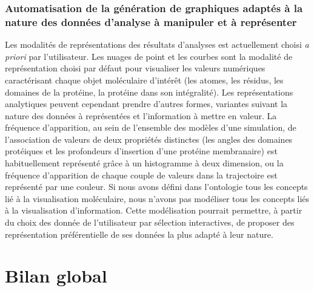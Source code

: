 \subsubsection*{Automatisation de la génération de graphiques adaptés à la nature des données d'analyse à manipuler et à représenter}

Les modalités de représentations des résultats d'analyses est actuellement choisi \textit{a  priori} par l'utilisateur. Les nuages de point et les courbes sont la modalité de représentation choisi par défaut pour visualiser les valeurs numériques caractérisant chaque objet moléculaire d'intérêt (les atomes, les résidus, les domaines de la protéine, la protéine dans son intégralité). Les représentations analytiques peuvent cependant prendre d'autres formes, variantes suivant la nature des données à représentées et l'information à mettre en valeur.  La fréquence d'apparition, au sein de l'ensemble des modèles d'une simulation, de l'association de valeurs de deux propriétés distinctes (les angles des domaines protéiques et les profondeurs d'insertion d'une protéine membranaire) est habituellement représenté grâce à un histogramme à deux dimension, ou la fréquence d'apparition de chaque couple de valeurs dans la trajectoire est représenté par une couleur. Si nous avons défini dans l'ontologie tous les concepts lié à la visualisation moléculaire, nous n'avons pas modéliser tous les concepts liés à la visualisation d'information. Cette modélisation pourrait permettre, à partir du choix des donnée de l'utilisateur par sélection interactives, de proposer des représentation préférentielle de ses données la plus adapté à leur nature.


\section*{Bilan global}

